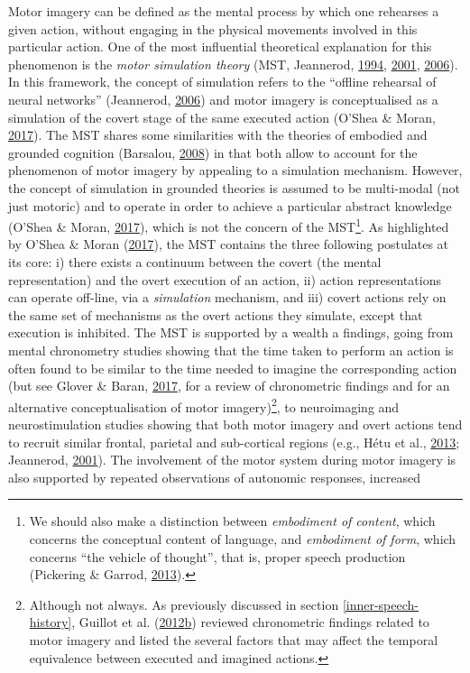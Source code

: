 \documentclass[a4paper,12pt,twoside,openright,oldfontcommands,final]{memoir}
\let\rmarkdownfootnote\footnote%
\def\footnote{\protect\rmarkdownfootnote}
\begin{document}
Motor imagery can be defined as the mental process by which one rehearses a given action, without engaging in the physical movements involved in this particular action. One of the most influential theoretical explanation for this phenomenon is the \emph{motor simulation theory} (MST, Jeannerod, \protect\hyperlink{ref-jeannerod_representing_1994}{1994}, \protect\hyperlink{ref-jeannerod_neural_2001}{2001}, \protect\hyperlink{ref-jeannerod_motor_2006}{2006}). In this framework, the concept of simulation refers to the \enquote{offline rehearsal of neural networks} (Jeannerod, \protect\hyperlink{ref-jeannerod_motor_2006}{2006}) and motor imagery is conceptualised as a simulation of the covert stage of the same executed action (O'Shea \& Moran, \protect\hyperlink{ref-oshea_does_2017}{2017}). The MST shares some similarities with the theories of embodied and grounded cognition (Barsalou, \protect\hyperlink{ref-Barsalou2008}{2008}) in that both allow to account for the phenomenon of motor imagery by appealing to a simulation mechanism. However, the concept of simulation in grounded theories is assumed to be multi-modal (not just motoric) and to operate in order to achieve a particular abstract knowledge (O'Shea \& Moran, \protect\hyperlink{ref-oshea_does_2017}{2017}), which is not the concern of the MST\footnote{We should also make a distinction between \emph{embodiment of content}, which concerns the conceptual content of language, and \emph{embodiment of form}, which concerns \enquote{the vehicle of thought}, that is, proper speech production (Pickering \& Garrod, \protect\hyperlink{ref-pickering_integrated_2013}{2013}).}. As highlighted by O'Shea \& Moran (\protect\hyperlink{ref-oshea_does_2017}{2017}), the MST contains the three following postulates at its core: i) there exists a continuum between the covert (the mental representation) and the overt execution of an action, ii) action representations can operate off-line, via a \emph{simulation} mechanism, and iii) covert actions rely on the same set of mechanisms as the overt actions they simulate, except that execution is inhibited. The MST is supported by a wealth a findings, going from mental chronometry studies showing that the time taken to perform an action is often found to be similar to the time needed to imagine the corresponding action (but see Glover \& Baran, \protect\hyperlink{ref-glover_motor-cognitive_2017}{2017}, for a review of chronometric findings and for an alternative conceptualisation of motor imagery)\footnote{Although not always. As previously discussed in section \ref{inner-speech-history}, Guillot et al. (\protect\hyperlink{ref-guillot_understanding_2012}{2012}\protect\hyperlink{ref-guillot_understanding_2012}{b}) reviewed chronometric findings related to motor imagery and listed the several factors that may affect the temporal equivalence between executed and imagined actions.}, to neuroimaging and neurostimulation studies showing that both motor imagery and overt actions tend to recruit similar frontal, parietal and sub-cortical regions (e.g., Hétu et al., \protect\hyperlink{ref-hetu_neural_2013}{2013}; Jeannerod, \protect\hyperlink{ref-jeannerod_neural_2001}{2001}). The involvement of the motor system during motor imagery is also supported by repeated observations of autonomic responses, increased 
\end{document}
